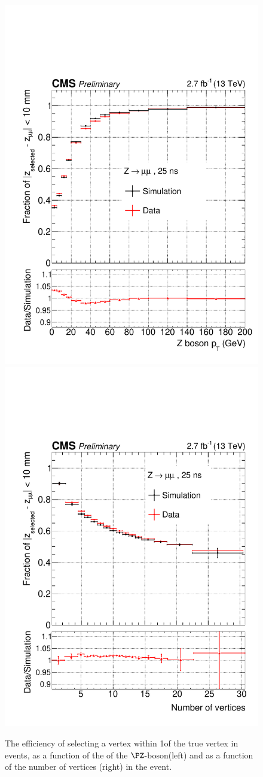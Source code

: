 \begin{figure}
\begin{center}
\includegraphics[width=0.45\linewidth]{recoFigures/last_Zmumu_eff_vs_pt_76X_VariableBins_ChangeHLT.pdf}
\includegraphics[width=0.45\linewidth]{recoFigures/last_Zmumu_eff_vs_nVtx_76X_VariableBins_ChangeHLT.pdf}
\caption{The efficiency of selecting a vertex within 1\cm of the true vertex in \Zmumu events, as a function of the \pT of the $\PZ$-boson(left) and as a function of the number of vertices (right) in the event.}
\label{fig:reco:vtx_id_eff_zmumu_validation}
\end{center}
\end{figure}

